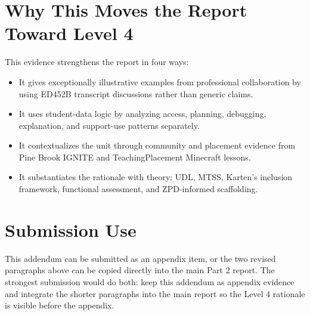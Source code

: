 \documentclass[12pt]{article}
\begin{document}
\section{Why This Moves the Report Toward Level 4}

This evidence strengthens the report in four ways:

\begin{itemize}
\item It gives exceptionally illustrative examples from professional collaboration by using ED452B transcript discussions rather than generic claims.
\item It uses student-data logic by analyzing access, planning, debugging, explanation, and support-use patterns separately.
\item It contextualizes the unit through community and placement evidence from Pine Brook IGNITE and TeachingPlacement Minecraft lessons.
\item It substantiates the rationale with theory: UDL, MTSS, Karten's inclusion framework, functional assessment, and ZPD-informed scaffolding.
\end{itemize}

\section{Submission Use}

This addendum can be submitted as an appendix item, or the two revised paragraphs above can be copied directly into the main Part 2 report. The strongest submission would do both: keep this addendum as appendix evidence and integrate the shorter paragraphs into the main report so the Level 4 rationale is visible before the appendix.
\end{document}
